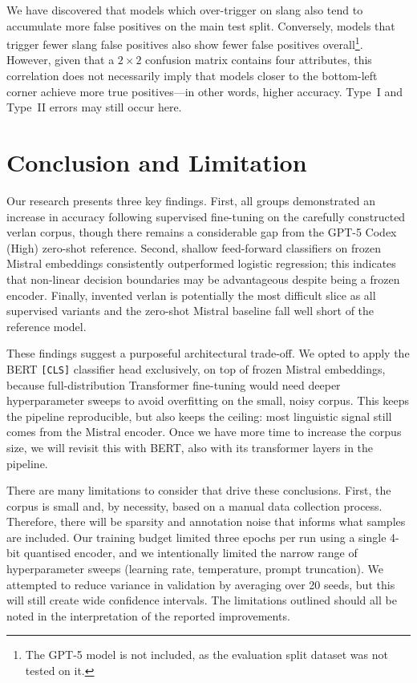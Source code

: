 \documentclass[12pt]{article}
\begin{document}
We have discovered that models which over-trigger on slang also tend to accumulate more false positives on the main test split. 
Conversely, models that trigger fewer slang false positives also show fewer false positives overall\footnote{The GPT-5 model is not included, as the evaluation split dataset was not tested on it.}. 
However, given that a $2 \times 2$ confusion matrix contains four attributes, this correlation does not necessarily imply that models closer to the bottom-left corner achieve more true positives\;---\;in other words, higher accuracy. 
Type~I and Type~II errors may still occur here.

\section{Conclusion and Limitation}

Our research presents three key findings. First, all groups demonstrated an increase in accuracy following supervised fine-tuning on the carefully constructed verlan corpus, though there remains a considerable gap from the GPT-5 Codex (High) zero-shot reference. Second, shallow feed-forward classifiers on frozen Mistral embeddings consistently outperformed logistic regression; this indicates that non-linear decision boundaries may be advantageous despite being a frozen encoder. Finally, invented verlan is potentially the most difficult slice as all supervised variants and the zero-shot Mistral baseline fall well short of the reference model.

These findings suggest a purposeful architectural trade-off. We opted to apply the BERT \texttt{[CLS]} classifier head exclusively, on top of frozen Mistral embeddings, because full-distribution Transformer fine-tuning would need deeper hyperparameter sweeps to avoid overfitting on the small, noisy corpus. This keeps the pipeline reproducible, but also keeps the ceiling: most linguistic signal still comes from the Mistral encoder. Once we have more time to increase the corpus size, we will revisit this with BERT, also with its transformer layers in the pipeline.

There are many limitations to consider that drive these conclusions. First, the corpus is small and, by necessity, based on a manual data collection process. Therefore, there will be sparsity and annotation noise that informs what samples are included. Our training budget limited three epochs per run using a single 4-bit quantised encoder, and we intentionally limited the narrow range of hyperparameter sweeps (learning rate, temperature, prompt truncation). We attempted to reduce variance in validation by averaging over 20 seeds, but this will still create wide confidence intervals. The limitations outlined should all be noted in the interpretation of the reported improvements.
\end{document}
